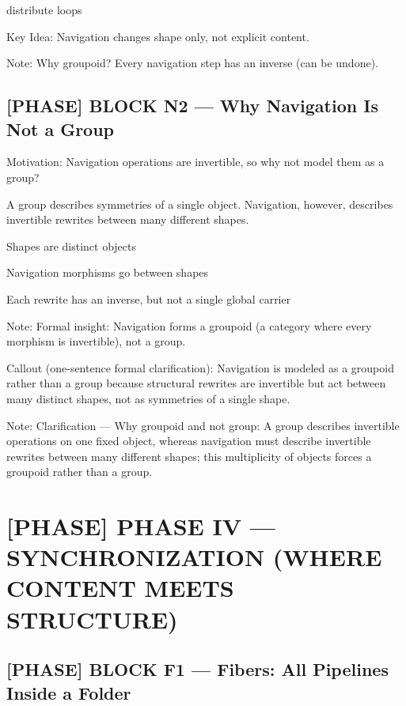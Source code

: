 distribute loops\par

 Key Idea: Navigation changes shape only, not explicit content.\par

Note: Why groupoid? Every navigation step has an inverse (can be undone).\par

\subsection*{[PHASE] BLOCK N2 --- Why Navigation Is Not a Group}

Motivation: Navigation operations are invertible, so why not model them as a group?\par

A group describes symmetries of a single object. Navigation, however, describes invertible rewrites between many different shapes.\par

Shapes are distinct objects\par

Navigation morphisms go between shapes\par

Each rewrite has an inverse, but not a single global carrier\par

Note: Formal insight: Navigation forms a groupoid (a category where every morphism is invertible), not a group.\par

 Callout (one-sentence formal clarification): Navigation is modeled as a groupoid rather than a group because structural rewrites are invertible but act between many distinct shapes, not as symmetries of a single shape.\par

Note: Clarification --- Why groupoid and not group: A group describes invertible operations on one fixed object, whereas navigation must describe invertible rewrites between many different shapes; this multiplicity of objects forces a groupoid rather than a group.\par

\section*{[PHASE] PHASE IV --- SYNCHRONIZATION (WHERE CONTENT MEETS STRUCTURE)}

\subsection*{[PHASE] BLOCK F1 --- Fibers: All Pipelines Inside a Folder }

